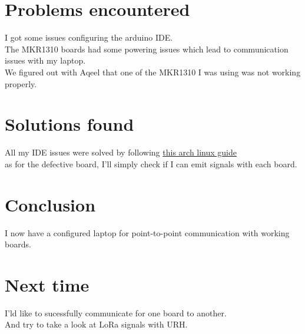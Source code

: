 \documentclass[a4paper, 12pt]{article}
\begin{document}
\section{Problems encountered} 
I got some issues configuring the arduino IDE.\\
The MKR1310 boards had some powering issues which lead to communication issues with my laptop.\\
We figured out with Aqeel that one of the MKR1310 I was using was not working properly.

\section{Solutions found}
All my IDE issues were solved by following \href{https://wiki.archlinux.org/title/Arduino}{this arch linux guide}\\
as for the defective board, I'll simply check if I can emit signals with each board.

\section{Conclusion}
I now have a configured laptop for point-to-point communication with working boards.

\section{Next time}
I'ld like to sucessfully communicate for one board to another.\\
And try to take a look at LoRa signals with URH.
\end{document}
